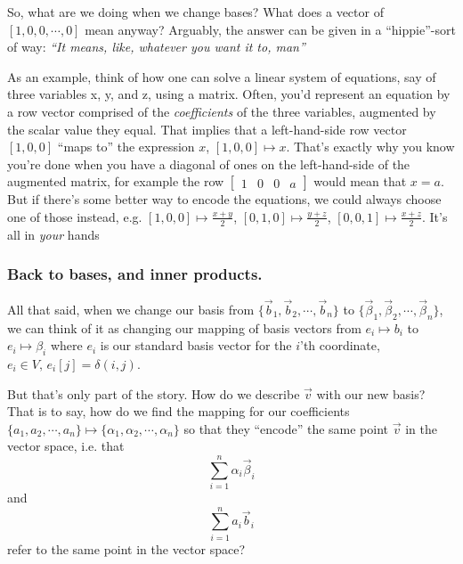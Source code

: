 \documentclass[letterpaper,12pt]{report}
\begin{document}
So, what are we doing when we change bases? What does a vector of
\(\left[1, 0, 0, \cdots, 0\right]\) mean anyway?
Arguably, the answer can be given in a ``hippie''-sort of way:
\textit{``It means, like, whatever you want it to, man\texttildelow''}\par

As an example, think of how one can solve a linear system of equations,
say of three variables x, y, and z,
using a matrix.
Often, you'd represent an equation by a row vector comprised of
the \emph{coefficients} of the three variables,
augmented by the scalar value they equal. That implies that
a left-hand-side row vector \([1, 0, 0]\) ``maps to'' the expression \(x\),
\([1,0,0] \mapsto x\). That's exactly why you know you're done when you have a 
diagonal of ones on the left-hand-side of the augmented matrix, for example the row
\(
\left[
\begin{array}{ccc|c}
1 & 0 & 0 & a
\end{array}
\right]
\)
would mean that \(x=a\).
But if there's some better way to encode the equations, we could always choose
one of those instead, e.g.
\([1,0,0] \mapsto \frac{x+y}{2}\), 
\([0,1,0] \mapsto \frac{y+z}{2}\),
\([0,0,1] \mapsto \frac{x+z}{2}\).
It's all in \emph{your} hands \texttildelow\par

\subsubsection*{Back to bases, and inner products.}

All that said, when we change our basis from
\(\{\vec{b}_1, \vec{b}_2, \cdots, \vec{b}_n\}\)
to 
\(\{\vec{\beta}_1, \vec{\beta}_2, \cdots, \vec{\beta}_n\}\),
we can think of it as changing our mapping of basis vectors from 
\(e_i \mapsto b_i\)
to
\(e_i \mapsto \beta_i\)
where \(e_i\) is our standard basis vector for the \(i\)'th coordinate, 
\(e_i \in V, \, e_i[j] = \delta(i,j)\).
\par

But that's only part of the story. How do we describe \(\vec{v}\)
with our new basis? That is to say, how do we find the mapping for our coefficients
\(\{a_1, a_2, \cdots, a_n\} \mapsto \{\alpha_1, \alpha_2, \cdots, \alpha_n\}\)
so that they ``encode'' the same point \(\vec{v}\) in the vector space, i.e. that
\[\sum_{i=1}^{n}\alpha_i\vec{\beta}_i \]
and
\[\sum_{i=1}^{n}a_i\vec{b}_i\]
refer to the same point in the vector space?\par
\end{document}
